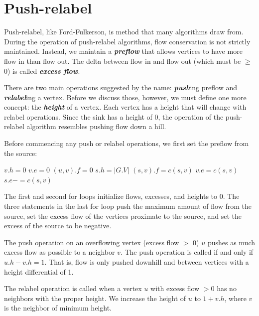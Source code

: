 \documentclass[11pt, oneside]{article}
\newcommand{\smallemphasis}[1]{\textbf{\textit{#1}}}
\begin{document}
\section{Push-relabel}

Push-relabel, like Ford-Fulkerson, is method that many algorithms draw from. During the operation of push-relabel algorithms, flow conservation is not strictly maintained. Instead, we maintain a \smallemphasis{preflow} that allows vertices to have more flow in than flow out. The delta between flow in and flow out (which must be \( \geq \) 0) is called \smallemphasis{excess flow}.

There are two main operations suggested by the name: \smallemphasis{push}ing preflow and \smallemphasis{relabel}ing a vertex. Before we discuss those, however, we must define one more concept: the \smallemphasis{height} of a vertex. Each vertex has a height that will change with relabel operations. Since the sink has a height of 0, the operation of the push-relabel algorithm resembles pushing flow down a hill.

Before commencing any push or relabel operations, we first set the preflow from the source:

\begin{algorithm}
  \begin{algorithmic}[h!]
         \State $v.h = 0$
         \State $v.e = 0$
      \EndFor
         \State $(u, v).f = 0$
      \EndFor
      \State $s.h = |G.V|$
         \State $(s, v).f = c(s, v)$
         \State $v.e = c(s, v)$
         \State $s.e -= c(s, v)$
      \EndFor
    \EndProcedure
  \end{algorithmic}
\end{algorithm}

The first and second for loops initialize flows, excesses, and heights to 0. The three statements in the last for loop push the maximum amount of flow from the source, set the excess flow of the vertices proximate to the source, and set the excess of the source to be negative.

The push operation on an overflowing vertex (excess flow \( > \) 0) \( u \) pushes as much excess flow as possible to a neighbor \( v \). The push operation is called if and only if \(u.h - v.h = 1 \). That is, flow is only pushed downhill and between vertices with a height differential of 1.

The relabel operation is called when a vertex \( u \) with excess flow \( > 0 \) has no neighbors with the proper height. We increase the height of \( u \) to \( 1 + v.h \), where \( v \) is the neighbor of minimum height.
\end{document}
